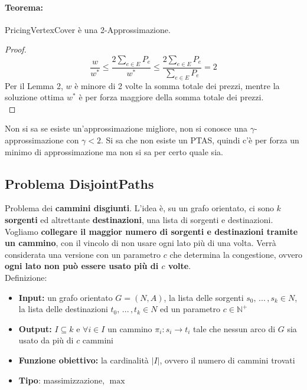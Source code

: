 \paragraph{Teorema:} PricingVertexCover è una 2-Approssimazione.\\

\begin{proof}
	$$ \frac{w}{w^\ast} \leq \frac{2 \sum_{e \in E} P_e}{w^\ast} \leq \frac{2 \sum_{e \in E} P_e}{\sum_{e \in E} P_e} = 2$$
	Per il Lemma 2, $w$ è minore di 2 volte la somma totale dei prezzi, mentre la soluzione ottima $w^\ast$ è per forza maggiore della somma totale dei prezzi. \\
\end{proof}

Non si sa se esiste un'approssimazione migliore, non si conosce una $\gamma$-approssimazione con $\gamma < 2$. Si sa che non esiste un PTAS, quindi c'è per forza un minimo di approssimazione ma non si sa per certo quale sia.\\

\newpage

\subsection{Problema DisjointPaths}

Problema dei \textbf{cammini disgiunti}. L'idea è, su un grafo orientato, ci sono $k$ \textbf{sorgenti} ed altrettante \textbf{destinazioni}, una lista di sorgenti e destinazioni. Vogliamo \textbf{collegare il maggior numero di sorgenti e destinazioni tramite un cammino}, con il vincolo di non usare ogni lato più di una volta. Verrà considerata una versione con un parametro $c$ che determina la congestione, ovvero \textbf{ogni lato non può essere usato più di $c$ volte}.\\

Definizione: 
\begin{itemize}
	\item \textbf{Input:} un grafo orientato $G = (N,A)$, la lista delle sorgenti $s_0, \, ... \, , s_k \in N$, la lista delle destinazioni $t_0, \, ... \, , t_k \in N$ ed un parametro $c \in \mathbb{N}^+$
	\item \textbf{Output:} $I \subseteq k$ e $\forall i \in I$ un cammino $\pi_i: s_i \rightarrow t_i$ tale che nessun arco di $G$ sia usato da più di $c$ cammini
	\item \textbf{Funzione obiettivo:} la cardinalità $|I|$, ovvero il numero di cammini trovati
	\item \textbf{Tipo}: massimizzazione, $\max$
\end{itemize}


